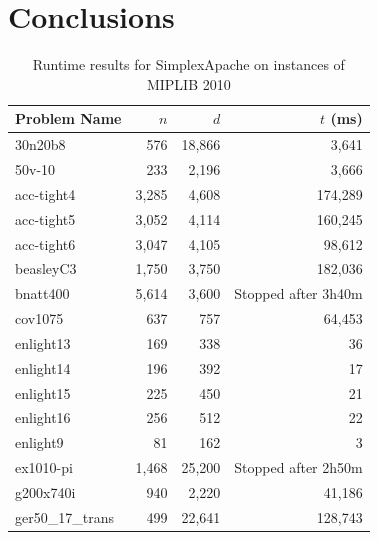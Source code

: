 \documentclass[nocopyrightspace]{acm_proc_article-sp}
\begin{document}
\section{Conclusions}



\balancecolumns

\appendix
\begin{table}[h!]
\label{tab:miplibresults}
\caption{Runtime results for SimplexApache on instances of MIPLIB 2010 \cite{KochEtAl2011}}
\begin{tabularx}{\columnwidth}{|X|r|r|r|}
\hline
Problem Name     & $n$  & $d$   & $t$ (ms) \\ \hline
30n20b8          & 576  & 18,866 & 3,641   \\ \hline
50v-10           & 233  & 2,196  & 3,666   \\ \hline
acc-tight4       & 3,285 & 4,608  & 174,289 \\ \hline
acc-tight5       & 3,052 & 4,114  & 160,245 \\ \hline
acc-tight6       & 3,047 & 4,105  & 98,612  \\ \hline
beasleyC3        & 1,750 & 3,750  & 182,036 \\ \hline
bnatt400         & 5,614 & 3,600 & Stopped after 3h40m \\ \hline
cov1075          & 637  & 757   & 64,453  \\ \hline
enlight13        & 169  & 338   & 36     \\ \hline
enlight14        & 196  & 392   & 17     \\ \hline
enlight15        & 225  & 450   & 21     \\ \hline
enlight16        & 256  & 512   & 22     \\ \hline
enlight9         & 81   & 162   & 3      \\ \hline
ex1010-pi		 & 1,468 & 25,200 & Stopped after 2h50m \\ \hline
g200x740i        & 940  & 2,220  & 41,186  \\ \hline
ger50\_17\_trans & 499  & 22,641 & 128,743 \\ \hline
\end{tabularx}
\end{table}
\end{document}
